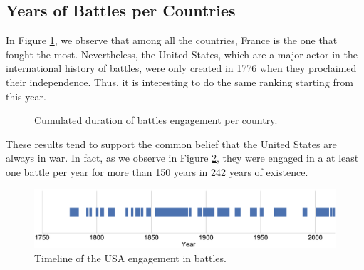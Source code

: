 \subsection{Years of Battles per Countries}
In Figure \ref{fig:FightingDurationRanking}, we observe that among all the countries, France is the one that fought the most. Nevertheless, the United States, which are a major actor in the international history of battles, were only created in 1776 when they proclaimed their independence. Thus, it is interesting to do the same ranking starting from this year. 
 \begin{figure}[h]
	\vspace{-0.5 em}
	\vspace{-0.1 em}
	\caption{Cumulated duration of battles engagement per country.} 
	\label{fig:FightingDurationRanking}
\end{figure}
 These results tend to support the common belief that the United States are always in war. In fact, as we observe in Figure \ref{fig:USAFightingTimeline}, they were engaged in a at least one battle per year for more than 150 years in 242 years of existence.
 \begin{figure}[h]
 	\centering	\includegraphics[width=\linewidth]{figures/USAFighting}
 	\caption{Timeline of the USA engagement in battles.}\label{fig:USAFightingTimeline}
 	\centering
 \end{figure}

